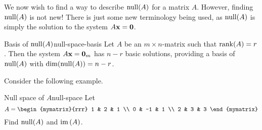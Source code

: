 We now wish to find a way to describe $\nullspace(A)$ for a matrix
$A$. However, finding $\nullspace(A)$ is not new! There is just
some new terminology being used, as $\nullspace(A) $ is simply
the solution to the system $A\mbox{\bf x}=\mbox{\bf 0}$.

\begin{theorem}{Basis of $\nullspace(A)$}{null-space-basis}
  Let $A$ be an $m \times n$-matrix such that $\rank(A) =
  r$. Then the system $A\mbox{\bf x}=\mbox{\bf 0}_m$ has $n-r$ basic
  solutions, providing a basis of $\nullspace(A)$ with
  $\dim(\nullspace(A))=n-r$.
\end{theorem}

Consider the following example.

\begin{example}{Null space of $A$}{null-space}
  Let
  \begin{equation*}
    A=\begin{mymatrix}{rrr}
      1 & 2 & 1 \\
      0 & -1 & 1 \\
      2 & 3 & 3
    \end{mymatrix}
  \end{equation*}
  Find $\nullspace(A) $ and $\mbox{\rm im}\left(A\right)$.
\end{example}

